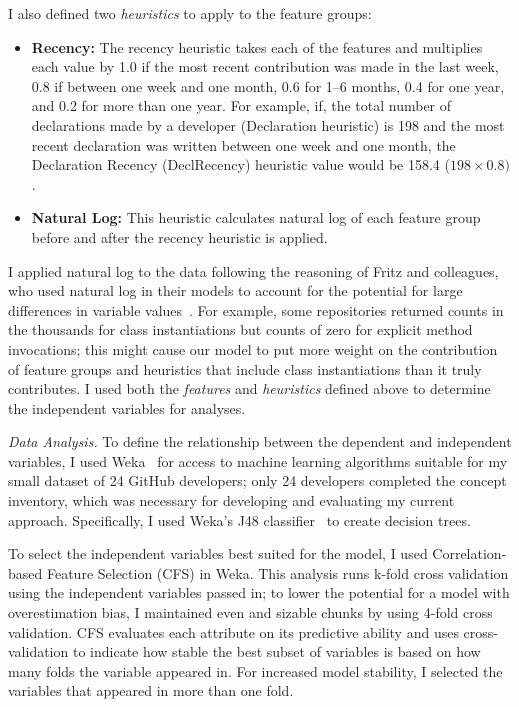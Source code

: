 \documentclass{llncs}
\begin{document}
\noindent I also defined two \emph{heuristics} to apply to the feature groups:

\begin{itemize}
	\item \textbf{Recency:} The recency heuristic takes each of the features and multiplies each value by 1.0 if the most recent contribution was made in the last week, 0.8 if between one week and one month, 0.6 for 1--6 months, 0.4 for one year, and 0.2 for more than one year.
	For example, if, the total number of declarations made by a developer (Declaration heuristic) is 198 and the most recent declaration was written between one week and one month, the Declaration Recency (DeclRecency) heuristic value would be 158.4 (\(198 \times 0.8)\). 
	\item \textbf{Natural Log:} This heuristic calculates natural log of each feature group before and after the recency heuristic is applied.
\end{itemize}
	
I applied natural log to the data following the reasoning of Fritz and colleagues, who used natural log in their models to account for the potential for large differences in variable values~\cite{fritz2010degree}. For example, some repositories returned counts in the thousands for class instantiations but counts of zero for explicit method invocations; this might cause our model to put more weight on the contribution of feature groups and heuristics that include class instantiations than it truly contributes.
I used both the \emph{features} and \emph{heuristics} defined above to determine the independent variables for analyses.

\vspace{0.5em}
\noindent\textit{Data Analysis.}
To define the relationship between the dependent and independent variables, I used Weka~\cite{Hall:2009:WDM:1656274.1656278} for access to machine learning algorithms suitable for my small dataset of 24 GitHub developers; only 24 developers completed the concept inventory, which was necessary for developing and evaluating my current approach. 
Specifically, I used Weka's J48 classifier~\cite{witten1999weka} to create decision trees.

To select the independent variables best suited for the model, I used Correlation-based Feature Selection (CFS) in Weka. This analysis runs k-fold cross validation using the independent variables passed in; to lower the potential for a model with overestimation bias, I maintained even and sizable chunks by using 4-fold cross validation.
CFS evaluates each attribute on its predictive ability and uses cross-validation to indicate how stable the best subset of variables is based on how many folds the variable appeared in.
For increased model stability, I selected the variables that appeared in more than one fold.
\end{document}
